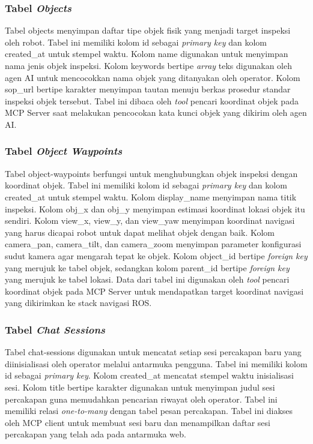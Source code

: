 \subsubsection{Tabel \textit{Objects}}
Tabel objects menyimpan daftar tipe objek fisik yang menjadi target inspeksi oleh robot. Tabel ini memiliki kolom id sebagai \textit{primary key} dan kolom created\_at untuk stempel waktu. Kolom name digunakan untuk menyimpan nama jenis objek inspeksi. Kolom keywords bertipe \textit{array} teks digunakan oleh agen AI untuk mencocokkan nama objek yang ditanyakan oleh operator. Kolom sop\_url bertipe karakter menyimpan tautan menuju berkas prosedur standar inspeksi objek tersebut. Tabel ini dibaca oleh \textit{tool} pencari koordinat objek pada MCP Server saat melakukan pencocokan kata kunci objek yang dikirim oleh agen AI.

\subsubsection{Tabel \textit{Object Waypoints}}
Tabel object-waypoints berfungsi untuk menghubungkan objek inspeksi dengan koordinat objek. Tabel ini memiliki kolom id sebagai \textit{primary key} dan kolom created\_at untuk stempel waktu. Kolom display\_name menyimpan nama titik inspeksi. Kolom obj\_x dan obj\_y menyimpan estimasi koordinat lokasi objek itu sendiri. Kolom view\_x, view\_y, dan view\_yaw menyimpan koordinat navigasi yang harus dicapai robot untuk dapat melihat objek dengan baik. Kolom camera\_pan, camera\_tilt, dan camera\_zoom menyimpan parameter konfigurasi sudut kamera agar mengarah tepat ke objek. Kolom object\_id bertipe \textit{foreign key} yang merujuk ke tabel objek, sedangkan kolom parent\_id bertipe \textit{foreign key} yang merujuk ke tabel lokasi. Data dari tabel ini digunakan oleh \textit{tool} pencari koordinat objek pada MCP Server untuk mendapatkan target koordinat navigasi yang dikirimkan ke stack navigasi ROS.

\subsubsection{Tabel \textit{Chat Sessions}}
Tabel chat-sessions digunakan untuk mencatat setiap sesi percakapan baru yang diinisialisasi oleh operator melalui antarmuka pengguna. Tabel ini memiliki kolom id sebagai \textit{primary key}. Kolom created\_at mencatat stempel waktu inisialisasi sesi. Kolom title bertipe karakter digunakan untuk menyimpan judul sesi percakapan guna memudahkan pencarian riwayat oleh operator. Tabel ini memiliki relasi \textit{one-to-many} dengan tabel pesan percakapan. Tabel ini diakses oleh MCP client untuk membuat sesi baru dan menampilkan daftar sesi percakapan yang telah ada pada antarmuka web.

